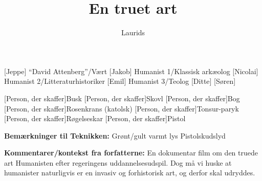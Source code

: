 \documentclass[a4paper,11pt]{article}
\title{En truet art}
\author{Laurids}
\begin{document}
\maketitle

\begin{roles}
    [Jeppe] ``David Attenberg''/Vært
    [Jakob] Humanist 1/Klassisk arkæolog
    [Nicolai] Humanist 2/Litteraturhistoriker
    [Emil] Humanist 3/Teolog
    [Ditte]
    [Søren]
\end{roles}


\begin{props}
    [Person, der skaffer]Busk
    [Person, der skaffer]Skovl
    [Person, der skaffer]Bog
    [Person, der skaffer]Rosenkrans (katolsk)
    [Person, der skaffer]Tonsur-paryk
    [Person, der skaffer]Røgelseskar
    [Person, der skaffer]Pistol
\end{props}

\textbf{Bemærkninger til Teknikken:}
Grønt/gult varmt lys
Pistolskudslyd

\textbf{Kommentarer/kontekst fra forfatterne:}
En dokumentar film om den truede art Humanisten efter regeringens uddannelsesudspil. Dog må vi huske at humanister naturligvis er en invasiv og forhistorisk art, og derfor skal udryddes.
\end{document}
